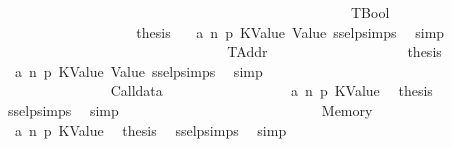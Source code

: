 \begin{isabellebody}
\isanewline
\ \ \ \ \ \ \ \ \ \ \ \ \ \ \ \ \ \isanewline
\ \ \ \ \ \ \ \ \ \ \ \ \ \ \isamarkupfalse%
\isanewline
\ \ \ \ \ \ \ \ \ \ \ \ \ \ \ \ \isamarkupfalse%
\ TBool\isanewline
\ \ \ \ \ \ \ \ \ \ \ \ \ \ \ \ \isamarkupfalse%
\ \isamarkupfalse%
\ {\isacharquery}{\kern0pt}thesis\ \isamarkupfalse%
\ {}\ a{}\ n\ p{}\ KValue\ Value\ ssel{\isachardot}{\kern0pt}psimps{\isacharparenleft}{\kern0pt}{}{\isacharparenright}{\kern0pt}\ \isamarkupfalse%
\ simp\isanewline
\isanewline
\ \ \ \ \ \ \ \ \ \ \ \ \ \ \isamarkupfalse%
\isanewline
\ \ \ \ \ \ \ \ \ \ \ \ \ \ \ \ \isamarkupfalse%
\ TAddr\isanewline
\ \ \ \ \ \ \ \ \ \ \ \ \ \ \ \ \isamarkupfalse%
\ \isamarkupfalse%
\ {\isacharquery}{\kern0pt}thesis\ \isamarkupfalse%
\ {}\ a{}\ n\ p{}\ KValue\ Value\ ssel{\isachardot}{\kern0pt}psimps{\isacharparenleft}{\kern0pt}{}{\isacharparenright}{\kern0pt}\ \isamarkupfalse%
\ simp\isanewline
\ \ \ \ \ \ \ \ \ \ \ \ \ \ \isamarkupfalse%
\isanewline
\ \ \ \ \ \ \ \ \ \ \ \ \isamarkupfalse%
\isanewline
\ \ \ \ \ \ \ \ \ \ \ \ \ \ \isamarkupfalse%
\ {\isacharparenleft}{\kern0pt}Calldata\ {\isacharunderscore}{\kern0pt}{\isacharparenright}{\kern0pt}\isanewline
\ \ \ \ \ \ \ \ \ \ \ \ \ \ \isamarkupfalse%
\ {}\ a{}\ n\ p{}\ KValue\ \isamarkupfalse%
\ {\isacharquery}{\kern0pt}thesis\ \isamarkupfalse%
\ ssel{\isachardot}{\kern0pt}psimps{\isacharparenleft}{\kern0pt}{}{\isacharparenright}{\kern0pt}\ \isamarkupfalse%
\ simp\isanewline
\ \ \ \ \ \ \ \ \ \ \ \ \isamarkupfalse%
\isanewline
\ \ \ \ \ \ \ \ \ \ \ \ \ \ \isamarkupfalse%
\ {\isacharparenleft}{\kern0pt}Memory\ {\isacharunderscore}{\kern0pt}{\isacharparenright}{\kern0pt}\isanewline
\ \ \ \ \ \ \ \ \ \ \ \ \ \ \isamarkupfalse%
\ {}\ a{}\ n\ p{}\ KValue\ \isamarkupfalse%
\ {\isacharquery}{\kern0pt}thesis\ \isamarkupfalse%
\ ssel{\isachardot}{\kern0pt}psimps{\isacharparenleft}{\kern0pt}{}{\isacharparenright}{\kern0pt}\ \isamarkupfalse%
\ simp\isanewline
\ \ \ \ \ \ \ \ \ \ \ \ \isamarkupfalse%
\isanewline
\ \ \ \ \ \ \ \ \ \ \ \ \ \ \isamarkupfalse%

\end{isabellebody}
